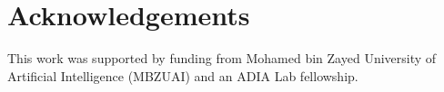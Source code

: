 \section{Acknowledgements}
This work was supported by funding from Mohamed bin Zayed University of Artificial Intelligence (MBZUAI) and an ADIA Lab fellowship.
